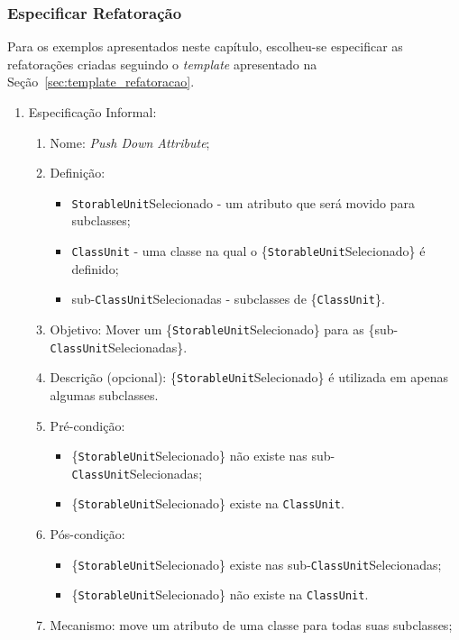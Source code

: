 \subsubsection{Especificar Refatoração}

Para os exemplos apresentados neste capítulo, escolheu-se especificar as refatorações criadas seguindo o \textit{template} apresentado na Seção~\ref{sec:template_refatoracao}.

\begin{enumerate}
	\item Especificação Informal:
		\begin{enumerate}
			\item Nome: \textit{Push Down Attribute};
			\item Definição:
			    \begin{itemize}
			        \item \texttt{StorableUnit}Selecionado - um atributo que será movido para subclasses;
			        \item \texttt{ClassUnit} - uma classe na qual o \{\texttt{StorableUnit}Selecionado\} é definido;
			        \item sub-\texttt{ClassUnit}Selecionadas - subclasses de \{\texttt{ClassUnit}\}.
			    \end{itemize}
			\item Objetivo: Mover um \{\texttt{StorableUnit}Selecionado\} para as \{sub-\texttt{ClassUnit}Selecionadas\}.
			\item Descrição (opcional): \{\texttt{StorableUnit}Selecionado\} é utilizada em apenas algumas subclasses.
			\item Pré-condição:
			    \begin{itemize}
			        \item \{\texttt{StorableUnit}Selecionado\} não existe nas sub-\texttt{ClassUnit}Selecionadas; 
			        \item \{\texttt{StorableUnit}Selecionado\} existe na \texttt{ClassUnit}. 
			    \end{itemize}
			\item Pós-condição:
			    \begin{itemize}
			        \item \{\texttt{StorableUnit}Selecionado\} existe nas sub-\texttt{ClassUnit}Selecionadas;
			        \item \{\texttt{StorableUnit}Selecionado\} não existe na \texttt{ClassUnit}.
			    \end{itemize}
			\item Mecanismo: move um atributo de uma classe para todas suas subclasses;

\end{enumerate}
\end{enumerate}

